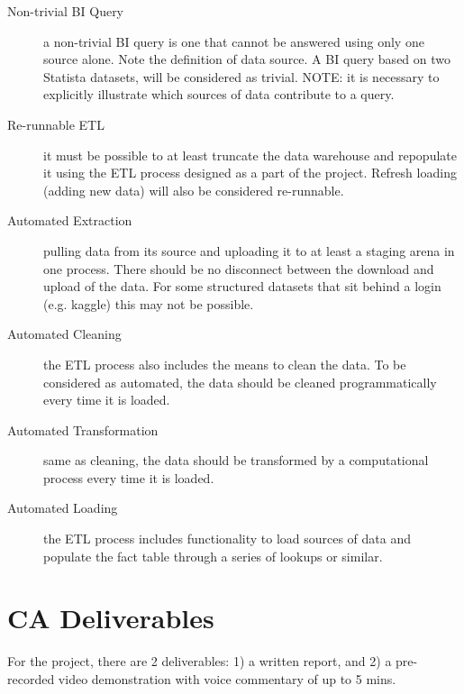 \documentclass{article}[a4paper,12pt]
\begin{document}
\begin{description}
\item[Non-trivial BI Query] a non-trivial BI query is one that cannot be answered using only one source alone. Note the definition of data source. A BI query based on two Statista datasets, will be considered as trivial. NOTE: it is necessary to explicitly illustrate which sources of data contribute to a query.

\item[Re-runnable ETL] it must be possible to at least truncate the data warehouse and repopulate it using the ETL process designed as a part of the project. Refresh loading (adding new data) will also be considered re-runnable.

\item[Automated Extraction] pulling data from its source and uploading it to at least a staging arena in one process. There should be no disconnect between the download and upload of the data. For some structured datasets that sit behind a login (e.g. kaggle) this may not be possible. 
\item[Automated Cleaning] the ETL process also includes the means to clean the data. To be considered as automated, the data should be cleaned programmatically every time it is loaded.
\item[Automated Transformation] same as cleaning, the data should be transformed by a computational process every time it is loaded.
\item[Automated Loading] the ETL process includes functionality to load sources of data and populate the fact table through a series of lookups or similar.
\end{description}

\section{CA Deliverables}
For the project, there are 2 deliverables: 1) a written report, and 2) a pre-recorded video demonstration with voice commentary of up to 5 mins.
\end{document}
